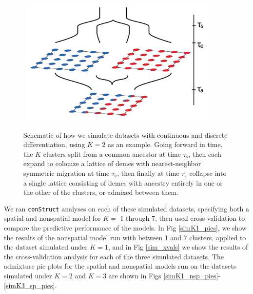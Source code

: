 \documentclass[12pt]{article}
\begin{document}
\begin{figure}
	\centering
		{\includegraphics[width=4in,height=2.5in]{figs/sims/sim_setup.png}}
		\caption{Schematic of how we simulate datasets with continuous and discrete differentiation, using $K=2$ as an example.  
			    Going forward in time, the $K$ clusters split from a common ancestor at time $\tau_{\text{s}}$,
			    then each expand to colonize a lattice of demes with nearest-neighbor symmetric migration at time $\tau_{\text{e}}$,
			    then finally at time $\tau_{\text{a}}$ collapse into a single lattice consisting of demes 
			    with ancestry entirely in one or the other of the clusters,
			    or admixed between them.
			    }\label{sim_setup}
\end{figure}

We ran \texttt{conStruct} analyses on each of these simulated datasets, 
specifying both a spatial and nonspatial model for $K = $ 1 through 7, 
then used cross-validation to compare the predictive performance of the models.
In Fig \ref{simK1_pies}, we show the results of the nonspatial model 
run with between 1 and 7 clusters, applied to the dataset simulated under $K=1$,
and in Fig \ref{sim_xvals} we show the results of the cross-validation analysis for each of the three simulated datasets.
The admixture pie plots for the spatial and nonspatial models run on the datasets simulated under $K=2$ and $K=3$
are shown in Figs \ref{simK1_nsp_pies}-\ref{simK3_sp_pies}.
\end{document}
